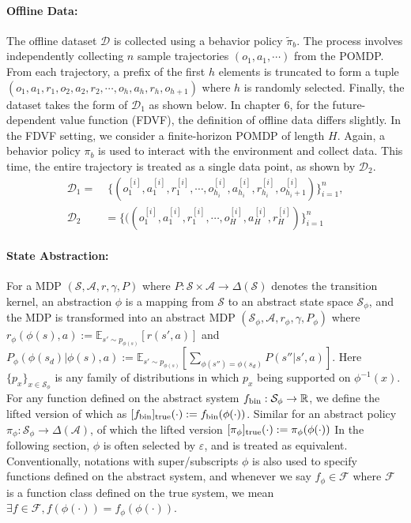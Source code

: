 \documentclass[twoside]{article}
\newcommand{\R}{\mathbb{R}}
\newcommand{\CAL}[1]{\mathcal{#1}}
\begin{document}
\paragraph{Offline Data:}
The offline dataset $\mathcal{D}$ is collected using a behavior policy $\tilde{\pi}_b$. The process involves independently collecting $n$ sample trajectories $(o_1, a_1, \cdots)$ from the POMDP. From each trajectory, a prefix of the first $h$ elements is truncated to form a tuple  $(o_1,a_1,r_1,o_2,a_2,r_2,\cdots, o_h,a_h,r_h,o_{h+1})$ where $h$ is randomly selected. Finally, the dataset takes the form of $\CAL{D}_1$ as shown below. In chapter 6, for the future-dependent value function (FDVF), the definition of offline data differs slightly. In the FDVF setting, we consider a finite-horizon POMDP of length $H$.
Again, a behavior policy $\pi_b$ is used to interact with the environment and collect data. This time, the entire trajectory is treated as a single data point, as shown by $\CAL{D}_2$.
\begingroup
\allowdisplaybreaks
\begin{align*}
\mathcal{D}_1=&\;\{(o_1^{[i]},a_1^{[i]},r_1^{[i]},\cdots, o_{h_i}^{[i]},a_{h_i}^{[i]},r_{h_i}^{[i]},o_{{h_i}+1}^{[i]})\}_{i=1}^n,\\ 
    \mathcal{D}_2&=\{((o_1^{[i]},a_1^{[i]},r_1^{[i]},\cdots,o_{{H}}^{[i]},a_{H}^{[i]},r_{H}^{[i]})\}_{i=1}^n
\end{align*}
\endgroup

\paragraph{State Abstraction:} For a MDP $(\CAL{S},\CAL{A},r,\gamma,P)$ where $P:\CAL{S}\times\CAL{A}\to\Delta(\CAL{S})$ denotes the transition kernel, an abstraction $\phi$ is a mapping from $\CAL{S}$ to an abstract state space $\CAL{S}_\phi$, and the MDP is transformed into an abstract MDP $(\CAL{S}_\phi,\CAL{A},r_\phi,\gamma,P_\phi)$ where $r_\phi(\phi(s),a):=\mathbb{E}_{s'\sim p_{\phi(s)}}[r(s',a)]$ and $P_\phi(\phi(s_d)|\phi(s),a):=\mathbb{E}_{s'\sim p_{\phi(s)}}[\sum_{\phi(s'')=\phi(s_d)}P(s''|s',a)]$. Here $\{p_x\}_{x\in\CAL{S}_\phi}$ is any family of distributions in which $p_x$ being supported on $\phi^{-1}(x)$. For any function defined on the abstract system $f_{\rm bin}:\CAL{S}_\phi\to\R$, we define the lifted version of which as $[f_{\rm bin}]_{\rm true}(\cdot):=f_{\rm bin}(\phi(\cdot))$. Similar for an abstract policy $\pi_\phi:\CAL{S}_\phi\to\Delta(\CAL{A})$, of which the lifted version $[\pi_\phi]_{\rm true}(\cdot):=\pi_\phi(\phi(\cdot))$ In the following section, $\phi$ is often selected by $\varepsilon$, and is treated as equivalent. Conventionally, notations with super/subscripts $\phi$ is also used to specify functions defined on the abstract system, and whenever we say $f_\phi\in\CAL{F}$ where $\CAL{F}$ is a function class defined on the true system, we mean $\exists f\in\CAL{F}, f(\phi(\cdot))=f_\phi(\phi(\cdot))$.
\end{document}
